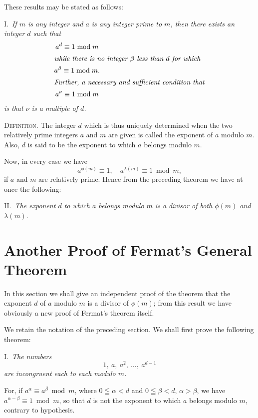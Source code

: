 \documentclass[oneside]{book}
\begin{document}
\smallskip These results may be stated as follows:

\smallskip I.~\emph{If $m$ is any integer and $a$ is any integer
prime to $m$, then there exists an integer $d$ such that}
\begin{gather*}
a^d\equiv 1 \bmod m \\
\intertext{\emph{while there is no integer $\beta$ less than $d$ for
which}}
a^\beta\equiv 1 \bmod m. \\
\intertext{\emph{Further, a necessary and sufficient condition
that}}
a^\nu \equiv 1 \bmod m
\end{gather*}
\emph{is that $\nu$ is a multiple of $d$.}

\smallskip \textsc{Definition.} The integer $d$ which is thus
uniquely determined when the two relatively prime integers $a$ and
$m$ are given is called the exponent of $a$ modulo $m$. Also, $d$ is
said to be the exponent to which $a$ belongs modulo $m$.

Now, in every case we have
\begin{equation*}
a^{\phi(m)} \equiv 1,\quad a^{\lambda(m)} \equiv 1 \bmod m,
\end{equation*}
if $a$ and $m$ are relatively prime. Hence from the preceding
theorem we have at once the following:

\smallskip II.~\textit{The exponent $d$ to which $a$ belongs modulo
$m$ is a divisor of both $\phi(m)$ and $\lambda(m)$.}%

\section{Another Proof of Fermat's General Theorem}\label{s33}

In this section we shall give an independent proof of the theorem
that the exponent $d$ of $a$ modulo $m$ is a divisor of $\phi(m)$;
from this result we have obviously a new proof of Fermat's theorem
itself.

We retain the notation of the preceding section. We shall first
prove the following theorem:

\smallskip I.~\textit{The numbers}
\begin{equation}
1,\ a,\ a^2,\ \ldots,\ a^{d-1} \tag{A}
\end{equation}
\textit{are incongruent each to each modulo $m$.}

For, if $a^\alpha \equiv a^\beta \bmod m$, where $0 \leqq \alpha <
d$ and $0 \leqq \beta < d$, $\alpha > \beta$, we have
$a^{\alpha-\beta} \equiv 1 \bmod m$, so that $d$ is not the exponent
to which $a$ belongs modulo $m$, contrary to hypothesis.
\end{document}
